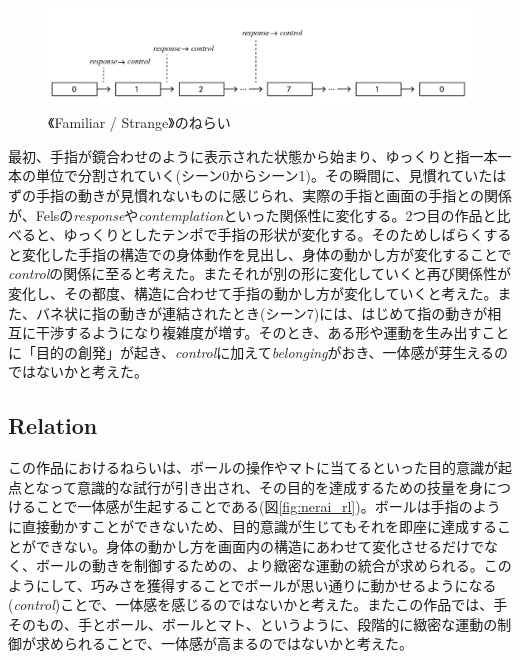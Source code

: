 \begin{figure}[H]
  \centering
  \includegraphics[width=15cm]{img/nerai_fs.png}
  \caption{《Familiar / Strange》のねらい}
  \label{fig:nerai_fs}
\end{figure}

最初、手指が鏡合わせのように表示された状態から始まり、ゆっくりと指一本一本の単位で分割されていく(シーン0からシーン1)。その瞬間に、見慣れていたはずの手指の動きが見慣れないものに感じられ、実際の手指と画面の手指との関係が、Felsの\textit{response}や\textit{contemplation}といった関係性に変化する。2つ目の作品と比べると、ゆっくりとしたテンポで手指の形状が変化する。そのためしばらくすると変化した手指の構造での身体動作を見出し、身体の動かし方が変化することで\textit{control}の関係に至ると考えた。またそれが別の形に変化していくと再び関係性が変化し、その都度、構造に合わせて手指の動かし方が変化していくと考えた。また、バネ状に指の動きが連結されたとき(シーン7)には、はじめて指の動きが相互に干渉するようになり複雑度が増す。そのとき、ある形や運動を生み出すことに「目的の創発」が起き、\textit{control}に加えて\textit{belonging}がおき、一体感が芽生えるのではないかと考えた。

\subsection*{Relation}
この作品におけるねらいは、ボールの操作やマトに当てるといった目的意識が起点となって意識的な試行が引き出され、その目的を達成するための技量を身につけることで一体感が生起することである(図\ref{fig:nerai_rl})。ボールは手指のように直接動かすことができないため、目的意識が生じてもそれを即座に達成することができない。身体の動かし方を画面内の構造にあわせて変化させるだけでなく、ボールの動きを制御するための、より緻密な運動の統合が求められる。このようにして、巧みさを獲得することでボールが思い通りに動かせるようになる(\textit{control})ことで、一体感を感じるのではないかと考えた。またこの作品では、手そのもの、手とボール、ボールとマト、というように、段階的に緻密な運動の制御が求められることで、一体感が高まるのではないかと考えた。

